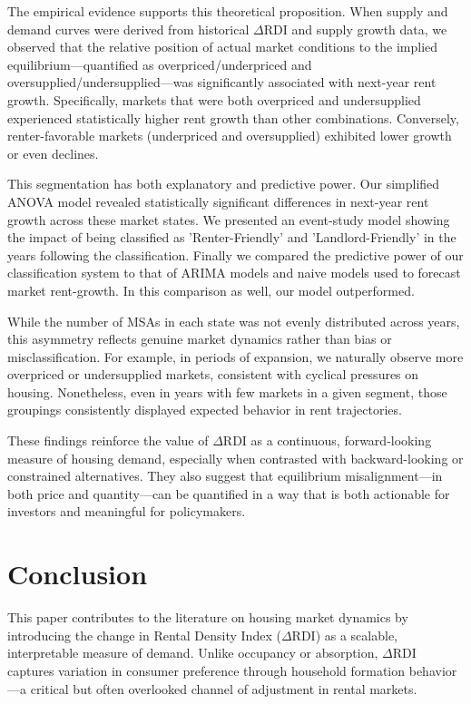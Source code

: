 \documentclass[APA,Times1COL]{WileyNJDv5} %
\begin{document}
The empirical evidence supports this theoretical proposition. When supply and demand curves were derived from historical \(\Delta\text{RDI}\) and supply growth data, we observed that the relative position of actual market conditions to the implied equilibrium---quantified as overpriced/underpriced and oversupplied/undersupplied---was significantly associated with next-year rent growth. Specifically, markets that were both overpriced and undersupplied experienced statistically higher rent growth than other combinations. Conversely, renter-favorable markets (underpriced and oversupplied) exhibited lower growth or even declines. 

This segmentation has both explanatory and predictive power. Our simplified ANOVA model revealed statistically significant differences in next-year rent growth across these market states. We presented an event-study model showing the impact of being classified as 'Renter-Friendly' and 'Landlord-Friendly' in the years following the classification. Finally we compared the predictive power of our classification system to that of ARIMA models and naive models used to forecast market rent-growth. In this comparison as well, our model outperformed. 

While the number of MSAs in each state was not evenly distributed across years, this asymmetry reflects genuine market dynamics rather than bias or misclassification. For example, in periods of expansion, we naturally observe more overpriced or undersupplied markets, consistent with cyclical pressures on housing. Nonetheless, even in years with few markets in a given segment, those groupings consistently displayed expected behavior in rent trajectories.

These findings reinforce the value of \(\Delta\text{RDI}\) as a continuous, forward-looking measure of housing demand, especially when contrasted with backward-looking or constrained alternatives. They also suggest that equilibrium misalignment---in both price and quantity---can be quantified in a way that is both actionable for investors and meaningful for policymakers.

\section{Conclusion}

This paper contributes to the literature on housing market dynamics by introducing the change in Rental Density Index (\(\Delta\text{RDI}\)) as a scalable, interpretable measure of demand. Unlike occupancy or absorption, \(\Delta\text{RDI}\) captures variation in consumer preference through household formation behavior---a critical but often overlooked channel of adjustment in rental markets.
\end{document}
